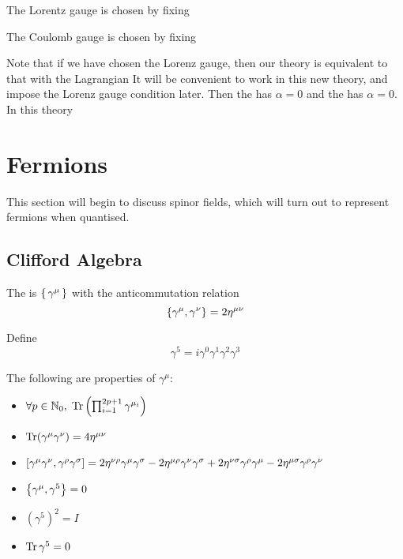 \documentclass{article}
\begin{document}
\begin{definition}
The Lorentz gauge is chosen by fixing 
\end{definition}

\begin{definition}
The Coulomb gauge is chosen by fixing 
\end{definition}

\begin{remark}
Note that if we have chosen the Lorenz gauge, then our theory is equivalent to that with the Lagrangian 
It will be convenient to work in this new theory, and impose the Lorenz gauge condition later. Then the  has $\alpha = 0$ and the  has $\alpha = 0$. In this theory 
\end{remark}

\section{Fermions}
This section will begin to discuss spinor fields, which will turn out to represent fermions when quantised.
\subsection{Clifford Algebra}
The  is $\set{ \gamma^\mu }$ with the anticommutation relation 
\[
\acomm[\gamma^\mu]{\gamma^\nu} = 2\eta^{\mu\nu}
\]

\begin{definition}[$\gamma^5$]
Define
\[
\gamma^5 = i \gamma^0 \gamma^1 \gamma^2 \gamma^3
\]
\end{definition}

\begin{theorem}
The following are properties of $\gamma^\mu$:
\begin{itemize}
    \item $\forall p\in\mbb{N}_0, \; \tr \left( \prod _ { i = 1 } ^ { 2 p + 1 } \gamma ^ { \mu _ { i } } \right)$
    \item $\tr(\gamma^\mu \gamma^\nu)=4\eta^{\mu\nu}$
    \item $\comm[\gamma^\mu\gamma^\nu]{\gamma^\rho\gamma^\sigma}=2\eta^{\nu\rho}\gamma^\mu\gamma^\sigma-2\eta^{\mu\rho}\gamma^\nu\gamma^\sigma+2\eta^{\nu\sigma}\gamma^\rho\gamma^\mu-2\eta^{\mu\sigma}\gamma^\rho\gamma^\nu$
    \item $\acomm[\gamma^\mu]{\gamma^5}=0$
    \item $(\gamma^5)^2=I$
    \item $\tr{\gamma^5}=0$
\end{itemize}
\end{theorem}
\end{document}
